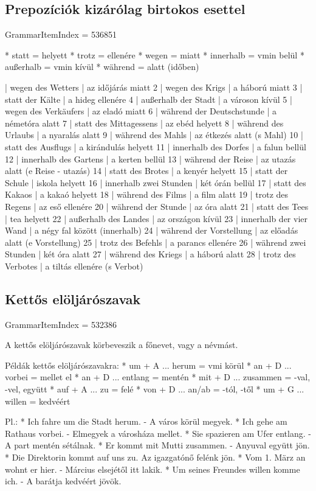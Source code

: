 \documentclass{article}
\newenvironment{desc}{\verbatim}{\endverbatim}
\newenvironment{exmp}{\verbatim}{\endverbatim}
\begin{document}
\subsection{Prepozíciók kizárólag birtokos esettel}

GrammarItemIndex = 536851

\begin{desc}
* statt = helyett
* trotz = ellenére
* wegen = miatt
* innerhalb = vmin belül
* außerhalb = vmin kívül
* während = alatt (időben)
\end{desc}

\begin{exmp}
1 | wegen des Wetters | az időjárás miatt
2 | wegen des Krigs | a háború miatt
3 | statt der Kälte | a hideg ellenére
4 | außerhalb der Stadt | a városon kívül
5 | wegen des Verkäufers | az eladó miatt
6 | während der Deutschstunde | a németóra alatt
7 | statt des Mittagessens | az ebéd helyett
8 | während des Urlaubs | a nyaralás alatt
9 | während des Mahls | az étkezés alatt (s Mahl)
10 | statt des Ausflugs | a kirándulás helyett
11 | innerhalb des Dorfes | a falun bellül
12 | innerhalb des Gartens | a kerten bellül
13 | während der Reise | az utazás alatt (e Reise - utazás)
14 | statt des Brotes | a kenyér helyett
15 | statt der Schule | iskola helyett
16 | innerhalb zwei Stunden | két órán bellül
17 | statt des Kakaos | a kakaó helyett
18 | während des Films | a film alatt
19 | trotz des Regens | az eső ellenére
20 | während der Stunde | az óra alatt
21 | statt des Tees | tea helyett
22 | außerhalb des Landes | az országon kívül
23 | innerhalb der vier Wand | a négy fal között (innerhalb)
24 | während der Vorstellung | az előadás alatt (e Vorstellung)
25 | trotz des Befehls | a parancs ellenére
26 | während zwei Stunden | két óra alatt
27 | während des Kriegs | a háború alatt
28 | trotz des Verbotes | a tiltás ellenére (s Verbot)
\end{exmp}

\subsection{Kettős elöljárószavak}

GrammarItemIndex = 532386

\begin{desc}
A kettős elöljárószavak körbeveszik a főnevet, vagy a névmást.

Példák kettős elöljárószavakra:
* um + A ... herum = vmi körül
* an + D ... vorbei = mellet el
* an + D ... entlang = mentén
* mit + D ... zusammen = -val, -vel, együtt
* auf + A ... zu = felé
* von + D ... an/ab = -tól, -től
* um + G ... willen = kedvéért

Pl.: * Ich fahre um die Stadt herum. - A város körül megyek.
* Ich gehe am Rathaus vorbei. - Elmegyek a városháza mellet.
* Sie spazieren am Ufer entlang. - A part mentén sétálnak.
* Er kommt mit Mutti zusammen. - Anyuval együtt jön.
* Die Direktorin kommt auf uns zu. Az igazgatónő felénk jön.
* Vom 1. März an wohnt er hier. - Március elsejétől itt lakik.
* Um seines Freundes willen komme ich. - A barátja kedvéért jövök.
\end{desc}
\end{document}

